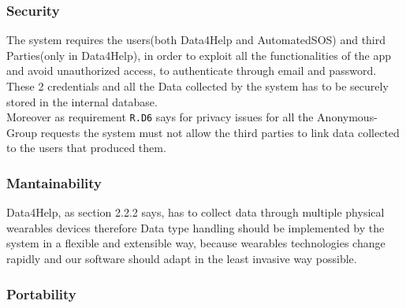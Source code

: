     \subsubsection{Security}
The system requires the users(both Data4Help and AutomatedSOS) and third Parties(only in Data4Help), in order to exploit all the functionalities of the app and avoid unauthorized access, to authenticate through email and password.\\ These 2 credentials and all the Data collected by the system has to be securely stored in the internal database.\\ Moreover as  requirement \texttt{R.D6} says for privacy issues for all the Anonymous-Group requests the system must not allow the third parties to link data collected to the users that produced them.
    \subsubsection{Mantainability}
Data4Help, as section 2.2.2 says, has to collect data through multiple physical wearables devices therefore 
Data type handling should be implemented by the system in a flexible and extensible way, because wearables technologies change rapidly and our software should adapt in the least invasive way possible.

    \subsubsection{Portability}











